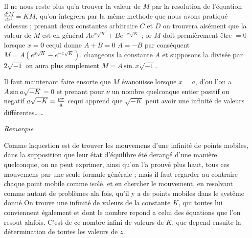 \documentclass[11pt,a4paper]{article}
\begin{document}
Il ne nous reste plus qu'a trouver la valeur de $M$ par la
resolution de l'équation $\frac{d^{2}M}{dx^{2}}=KM$, qu'on integrera par la même
methode que nous avons pratiqué cidessus ; prenant deux
constantes arbitraire $C$ et $D$ on trouvera aisément que la valeur
de $M$ est en général $Ae^{x\sqrt{K}}+Be^{-x\sqrt{K}}$ ; or $M$ doit premièrement
être $=0$ lorsque $x=0$ cequi donne $A+B=0$ $A=-B$ par conséquent
$M=A(e^{x\sqrt{K}}-e^{-x\sqrt{K}})$. changeons la constante $A$ et supposons
la divisée par $2\sqrt{-1}$ on aura plus simplement $M=A\,\text{sin.}\,x\sqrt{-1}$.

Il faut maintenant faire ensorte que $M$ évanoüisse lorsque
$x=a$, d'ou l'on a $A\,\text{sin}\,a\sqrt{-K}=0$ et prenant pour $\nu$ un nombre
 quelconque entier positif ou negatif $a\sqrt{-K}=\frac{\nu\pi}{\uncertain{a}}$ cequi apprend
que $\sqrt{-K}$ peut avoir une infinité de valeurs différentes\ldots\ldots
{}

\emph{Remarque}

Comme laquestion est de trouver les mouvemens d'une infinité
de points mobiles, dans la supposition que leur état d'équilibre
 été derangé d'une manière quelconque, on ne peut exprimer,
ainsi qu'on l'a prouvé plus haut,  tous ces mouvemens
par une seule formule générale ; mais il faut regarder au
contraire chaque point mobile comme isolé, et en chercher
le mouvement, en resolvant comme autant de problèmes ala
fois, qu'il y a de points  mobiles dans le systême donné
On trouve une infinité de valeurs de la constante $K$, qui
toutes lui conviennent également et dont le nombre repond a
celui des équations que l'on resout alafois. C'est de ce nombre
infini de valeurs de $K$, que depend ensuite la détermination
de toutes les valeurs de $z$.

\end{document}
